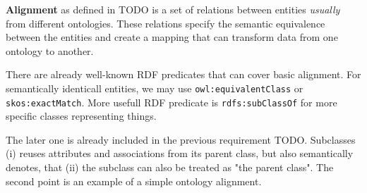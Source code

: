 \textbf{Alignment} as defined in TODO is a set of relations between entities \textit{usually} from different ontologies. These relations specify the semantic equivalence between the entities and create a mapping that can transform data from one ontology to another.

There are already well-known RDF predicates that can cover basic alignment. For semantically identicall entities, we may use \verb|owl:equivalentClass| or \verb|skos:exactMatch|. More usefull RDF predicate is \verb|rdfs:subClassOf| for more specific classes representing things.

The later one is already included in the previous requirement TODO. Subclasses (i) reuses attributes and associations from its parent class, but also semantically denotes, that (ii) the subclass can also be treated as "the parent class". The second point is an example of a simple ontology alignment.

\begin{showcase}
\end{showcase}





